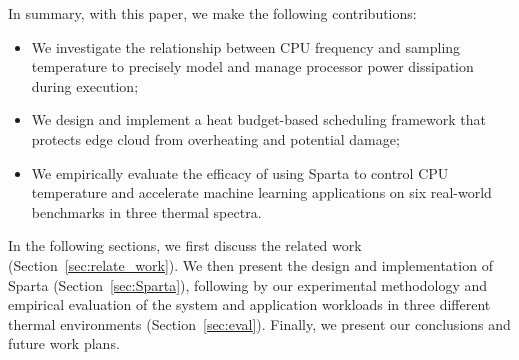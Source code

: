 In summary, with this paper, we make the following contributions:

\begin{itemize}
    \item We investigate the relationship between CPU frequency and sampling temperature to precisely model and manage processor power dissipation during execution;
    \vspace{1mm}
    \item We design and implement a heat budget-based scheduling framework that protects edge cloud from overheating and potential damage;
    \vspace{1mm}
    \item We empirically evaluate the efficacy of using Sparta to control CPU temperature and accelerate machine learning applications on six real-world benchmarks in three thermal spectra. 
\end{itemize}

In the following sections, we first discuss the related work (Section~\ref{sec:relate_work}). We then present the design and implementation of Sparta (Section~\ref{sec:Sparta}), following by our experimental methodology and empirical evaluation of the system and application workloads in three different thermal environments (Section~\ref{sec:eval}). Finally, we present our conclusions and future work plans.